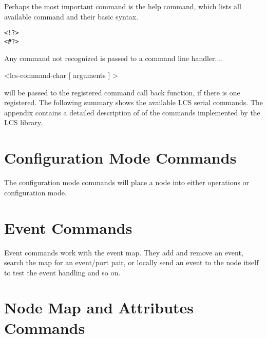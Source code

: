 Perhaps the most important command is the help command, which lists all available command and  their basic syntax.

\lstset{style=codesnippetstyle}
\begin{lstlisting}
<!?>
<#?>
\end{lstlisting}

Any command not recognized is passed to a command line handler....

<lcs-command-char [ arguments ] >


will be passed to the registered command call back function, if there is one registered. The following summary shows the available LCS serial commands. The appendix contains a detailed description of of the commands implemented by the LCS library.

\section{Configuration Mode Commands}

The configuration mode commands will place a node into either operations or configuration mode.


\section{Event Commands}

Event commands work with the event map. They add and remove an event, search the map for an event/port pair, or locally send an event to the node itself to test the event handling and so on.


\section{Node Map and Attributes Commands}

